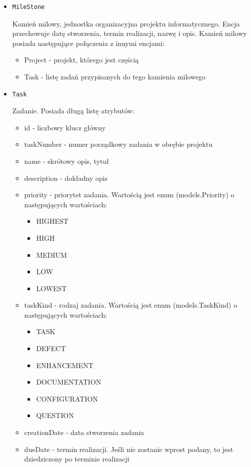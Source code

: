 \documentclass[a4paper,12pt,notitlepage]{mwrep}
\begin{document}
\begin{itemize}
	\item	\begin{verbatim}MileStone\end{verbatim} Kamień milowy, jednostka organizacyjna projektu informatycznego. Encja przechowuje datę stworzenia, 
		termin realizacji, nazwę i opis. Kamień milowy posiada następujące połączenia z innymi encjami:
		\begin{itemize}
			\item	Project - projekt, którego jest częścią
			\item	Task - listę zadań przypisanych do tego kamienia milowego
		\end{itemize}

	\item	\begin{verbatim}Task\end{verbatim} Zadanie. Posiada długą listę atrybutów:
		\begin{itemize}
			\item	id - liczbowy klucz główny
			\item	taskNumber - numer porządkowy zadania w obrębie projektu
			\item	name - skrótowy opis, tytuł
			\item	description - dokładny opis
			\item	priority - priorytet zadania. Wartością jest enum (models.Priority) o następujących wartościach:
			\begin{itemize}
				\item	HIGHEST
				\item	HIGH
				\item	MEDIUM
				\item	LOW
				\item	LOWEST
			\end{itemize}
			\item	taskKind - rodzaj zadania. Wartością jest enum (models.TaskKind) o następujących wartościach:
			\begin{itemize}
				\item	TASK
				\item	DEFECT
				\item	ENHANCEMENT
				\item	DOCUMENTATION
				\item	CONFIGURATION
				\item	QUESTION
			\end{itemize}
			\item	creationDate - data stworzenia zadania
			\item	dueDate - termin realizacji. Jeśli nie zostanie wprost podany, to jest dziedziczony po terminie realizacji 

\end{itemize}
\end{itemize}
\end{document}
